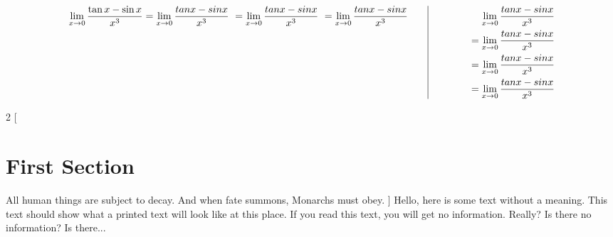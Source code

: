 \documentclass[14pt]{extarticle}
\begin{document}
\begin{equation*}
\lim_{x \to 0} \frac{\tan{x} - \sin {x}}{x^3}\\
\\ =\lim_{x \to 0} \frac{tan x - sin x}{x^3}\\ 
\ =\lim_{x \to 0} \frac{tan x - sin x}{x^3} \\
\ =\lim_{x \to 0} \frac{tan x - sin x}{x^3} 
\qquad 
\vrule
\qquad
\begin{aligned}[t]
\end{aligned}
\qquad
\begin{aligned}[t]
\lim_{x \to 0} \frac{tan x - sin x}{x^3} \\
\ =\lim_{x \to 0} \frac{tan x - sin x}{x^3}\\ 
\ =\lim_{x \to 0} \frac{tan x - sin x}{x^3} \\
\ =\lim_{x \to 0} \frac{tan x - sin x}{x^3} 
\end{aligned}
\end{equation*}

\begin{multicols}{2}
[
\section{First Section}
All human things are subject to decay. And when fate summons, Monarchs must obey.
]
Hello, here is some text without a meaning.  This text should show what 
a printed text will look like at this place.
If you read this text, you will get no information.  Really?  Is there 
no information?  Is there...
\end{multicols}
\end{document}
